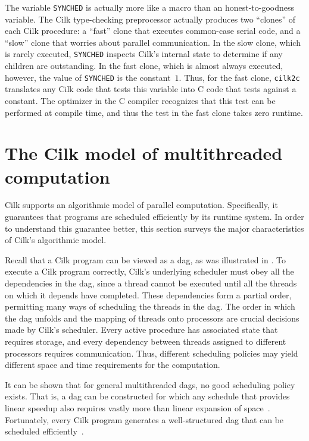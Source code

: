 The variable \texttt{SYNCHED} is actually more like a macro than an
honest-to-goodness variable.  The Cilk type-checking preprocessor
\cite{Miller95} actually produces two ``clones'' of each Cilk
procedure: a ``fast'' clone that executes common-case serial code, and
a ``slow'' clone that worries about parallel communication.  In the
slow clone, which is rarely executed, \texttt{SYNCHED} inspects Cilk's
internal state to determine if any children are outstanding.  In the
fast clone, which is almost always executed, however, the value of
\texttt{SYNCHED} is the constant~$1$.  Thus, for the fast clone,
\texttt{cilk2c} translates any Cilk code that tests this variable into
C code that tests against a constant.  The optimizer in the C compiler
recognizes that this test can be performed at compile time, and thus
the test in the fast clone takes zero runtime.


\section{The Cilk model of multithreaded computation}
\label{sec:model}

Cilk supports an algorithmic model of parallel computation.
Specifically, it guarantees that programs are scheduled efficiently by
its runtime system.  In order to understand this guarantee better,
this section surveys the major characteristics of Cilk's algorithmic
model.

Recall that a Cilk program can be viewed as a dag, as was illustrated
in .  To execute a Cilk program correctly, Cilk's
underlying scheduler must obey all the dependencies in the dag, since
a thread cannot be executed until all the threads on which it depends
have completed.  These dependencies form a partial order, permitting
many ways of scheduling the threads in the dag.  The order in which
the dag unfolds and the mapping of threads onto processors are crucial
decisions made by Cilk's scheduler.  Every active procedure has
associated state that requires storage, and every dependency between
threads assigned to different processors requires communication.
Thus, different scheduling policies may yield different space and time
requirements for the computation.

It can be shown that for general multithreaded dags, no good
scheduling policy exists.  That is, a dag can be constructed for which
any schedule that provides linear speedup also requires vastly more
than linear expansion of space~\cite{BlumofeLe93}.  Fortunately, every
Cilk program generates a well-structured dag that can be scheduled
efficiently~\cite{BlumofeLe94}.

